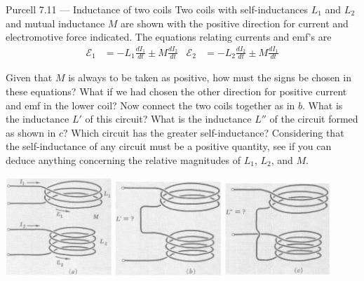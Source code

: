 \documentclass[makesolutionspdf]{esg8022pset}
\begin{document}
\begin{problem}{Purcell 7.11 --- Inductance of two coils}
  Two coils with self-inductances $L_1$ and $L_2$ and mutual inductance $M$
  are shown with the positive direction for current and electromotive force
  indicated. The equations relating currents and emf's are
  \begin{align*}
    \mathcal{E}_1 & = -L_1\frac{dI_1}{dt}\pm M\frac{dI_2}{dt} 
    & \mathcal{E}_2 & = -L_2\frac{dI_2}{dt}\pm M\frac{dI_1}{dt}
  \end{align*}
  
  Given that $M$ is always to be taken as positive, how must the signs be
  chosen in these equations? What if we had chosen the other direction for
  positive current and emf in the lower coil? Now connect the two coils
  together as in $b$. What is the inductance $L'$ of this circuit? What is the
  inductance $L''$ of the circuit formed as shown in $c$? Which circuit has the
  greater self-inductance? Considering that the self-inductance of any circuit
  must be a positive quantity, see if you can deduce anything concerning the
  relative magnitudes of $L_1$, $L_2$, and $M$.

  \begin{center}
    \includegraphics[width = 0.3\textwidth]{pu711a}
    \includegraphics[width = 0.3\textwidth]{pu711b}
    \includegraphics[width = 0.3\textwidth]{pu711c}
  \end{center}
\end{problem}
\end{document}
